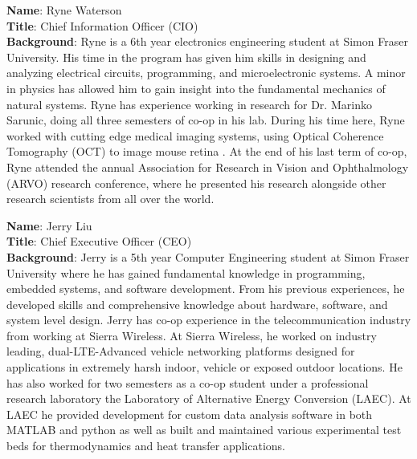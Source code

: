 \pagebreak
\textbf{Name}: Ryne Waterson\\
\medskip
\textbf{Title}: Chief Information Officer (CIO)\\
\medskip
\textbf{Background}: Ryne is a 6th year electronics engineering student at Simon Fraser University. His time in the program has given him skills in designing and analyzing electrical circuits, programming, and microelectronic systems. A minor in physics has allowed him to gain insight into the fundamental mechanics of natural systems. Ryne has experience working in research for Dr. Marinko Sarunic, doing all three semesters of co-op in his lab. During his time here, Ryne worked with cutting edge medical imaging systems, using Optical Coherence Tomography (OCT) to image mouse retina . At the end of his last term of co-op, Ryne attended the annual Association for Research in Vision and Ophthalmology (ARVO) research conference, where he presented his research alongside other research scientists from all over the world.  

\bigskip
\bigskip
\textbf{Name}: Jerry Liu \\
\medskip
\textbf{Title}: Chief Executive Officer (CEO) \\
\medskip
\textbf{Background}: Jerry is a 5th year Computer Engineering student at Simon Fraser University where he has gained fundamental knowledge in programming, embedded systems, and  software development. From his previous experiences, he developed skills and comprehensive knowledge about hardware, software, and system level design. Jerry has co-op experience in the telecommunication industry from working at Sierra Wireless. At Sierra Wireless, he worked on industry leading, dual-LTE-Advanced vehicle networking platforms designed for applications in extremely harsh indoor, vehicle or exposed outdoor locations. He has also worked for two semesters as a co-op student under a professional research laboratory the Laboratory of Alternative Energy Conversion (LAEC). At LAEC he provided development for custom data analysis software in both MATLAB and python as well as built and maintained various experimental test beds for thermodynamics and heat transfer applications.

